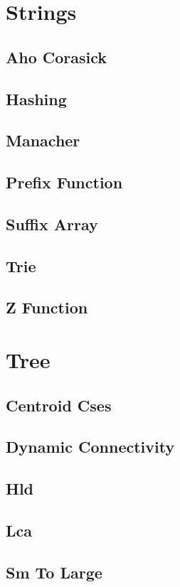 \documentclass[9pt,portrait,twocolumn,a4paper,notitlepage]{article}
\newcommand\cppfile[2][]{%
\ifstrempty{#1}{}{}%
}
\begin{document}
\section{Strings}

\subsection{Aho Corasick}
\cppfile{strings_clean/aho_corasick.cpp}

\subsection{Hashing}
\cppfile{strings_clean/hashing.cpp}

\subsection{Manacher}
\cppfile{strings_clean/manacher.cpp}

\subsection{Prefix Function}
\cppfile{strings_clean/prefix_function.cpp}

\subsection{Suffix Array}
\cppfile{strings_clean/suffix_array.cpp}

\subsection{Trie}
\cppfile{strings_clean/trie.cpp}

\subsection{Z Function}
\cppfile{strings_clean/z_function.cpp}


\section{Tree}

\subsection{Centroid Cses}
\cppfile{tree_clean/centroid_cses.cpp}

\subsection{Dynamic Connectivity}
\cppfile{tree_clean/dynamic_connectivity.cpp}

\subsection{Hld}
\cppfile{tree_clean/hld.cpp}

\subsection{Lca}
\cppfile{tree_clean/LCA.cpp}

\subsection{Sm To Large}
\cppfile{tree_clean/sm_to_large.cpp}
\end{document}
